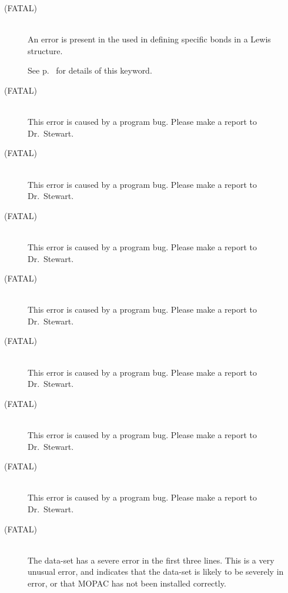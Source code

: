 \begin{description}
\item[ (FATAL)]~\\
An error is present in the  used in
defining specific bonds in a Lewis structure.  
\begin{latexonly}
See p.~\pageref{cvb} for details of this keyword.
\end{latexonly}

\item[ (FATAL)]~\\
This error is caused by a program bug.  Please make a report to Dr.~Stewart.

\item[ (FATAL)]~\\
This error is caused by a program bug.  Please make a report to Dr.~Stewart.

\item[ (FATAL)]~\\
This error is caused by a program bug.  Please make a report to Dr.~Stewart.

\item[ (FATAL)]~\\
This error is caused by a program bug.  Please make a report to Dr.~Stewart.

\item[ (FATAL)]~\\
This error is caused by a program bug.  Please make a report to Dr.~Stewart.

\item[ (FATAL)]~\\
This error is caused by a program bug.  Please make a report to Dr.~Stewart.

\item[ (FATAL)]~\\
This error is caused by a program bug.  Please make a report to Dr.~Stewart.

\item[ (FATAL)]~\\
The data-set has a severe error in the first three lines.  This is a very
unusual error, and indicates that the data-set is likely to be severely
in error, or that MOPAC has not been installed correctly.


\end{description}
